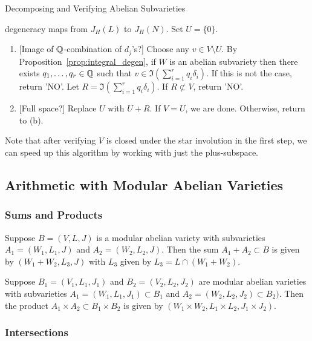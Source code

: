 \documentclass{article}
\begin{document}
\begin{algorithm}{Decomposing and Verifying Abelian Subvarieties}
\begin{enumerate}
            degeneracy maps from $J_H(L)$ to $J_H(N)$.  Set $U=\{0\}$.
            \begin{enumerate}
                \item{} [Image of $\mathbb{Q}$-combination of $d_j$'s?]
                    Choose any $v\in V\setminus U$. By
                    Proposition~\ref{prop:integral_degen}, if $W$ is an abelian
                    subvariety then there exists $q_1,\ldots,q_r\in \mathbb{Q}$
                    such that $v\in \Im \left(\sum_{i=1} ^r q_i
                    \delta_i\right)$. If this is not the case, return
                    'NO'. Let $R = \Im \left(\sum_{i=1} ^r q_i
                    \delta_i\right)$. If $R\not\subset V$, return 'NO'.
                \item{} [Full space?]
                    Replace $U$ with $U+R$. If $V=U$, we are done. Otherwise,
                    return to (b).
            \end{enumerate}
    \end{enumerate}
\end{algorithm}

Note that after verifying $V$ is closed under the star involution in the first
step, we can speed up this algorithm by working with just the plus-subspace.


\subsection{Arithmetic with Modular Abelian Varieties}

\subsubsection{Sums and Products}

Suppose $B=(V, L, J)$ is a modular abelian variety with subvarieties $A_1=(W_1,
L_1, J)$ and $A_2=(W_2, L_2, J)$. Then the sum $A_1+A_2\subset B$ is given by
$(W_1+W_2, L_3, J)$ with $L_3$ given by $L_3 = L\cap (W_1+W_2)$.

Suppose $B_1=(V_1, L_1, J_1)$ and $B_2=(V_2, L_2, J_2)$ are modular abelian
varieties with subvarieties $A_1=(W_1, L_1, J_1)\subset B_1$ and $A_2=(W_2,
L_2, J_2)\subset B_2)$. Then the product $A_1\times A_2\subset B_1\times
B_2$ is given by $(W_1\times W_2, L_1\times L_2, J_1\times J_2)$.

\subsubsection{Intersections}
\label{sec:modabvar_intersections}
\end{document}
